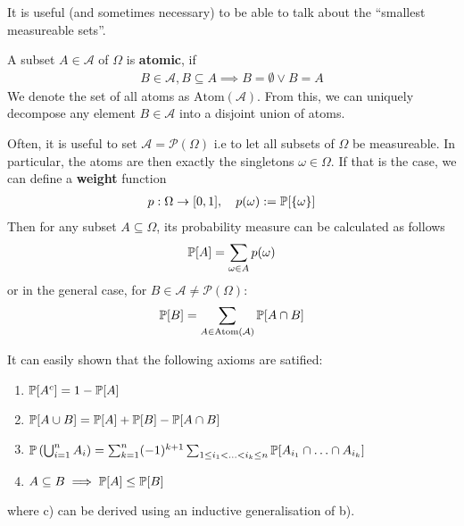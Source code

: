 It is useful (and sometimes necessary) to be able to talk about the ``smallest measureable sets''.
\begin{dfn}[]
A subset $A \in \mathcal{A}$ of $\Omega$ is \textbf{atomic}, if 
\begin{align*}
  B \in \mathcal{A}, B \subseteq A \implies B = \emptyset \lor B = A
\end{align*}
We denote the set of all atoms as $\text{Atom}(\mathcal{A})$. 
From this, we can uniquely decompose any element $B \in \mathcal{A}$ into a disjoint union of atoms.
\end{dfn}

\begin{rem}[]
  Often, it is useful to set $\mathcal{A} = \mathcal{P}(\Omega)$ i.e to let all subsets of $\Omega$ be measureable. In particular, the atoms are then exactly the singletons $\omega \in \Omega$. If that is the case, we can define a \textbf{weight} function
\begin{align*}
  p: \Omega \to [0,1], \quad p(\omega) := \mathbb{P}[\{\omega\}]
\end{align*}
  Then for any subset $A \subseteq \Omega$, its probability measure can be calculated as follows
  \begin{align*}
    \mathbb{P}[A] = \sum_{\omega \in A}p(\omega)
  \end{align*}
  or in the general case, for $B \in \mathcal{A} \neq \mathcal{P}(\Omega)$:
  \begin{align*}
    \mathbb{P}[B] = \sum_{A \in \text{Atom}(\mathcal{A})} \mathbb{P}[A \cap B]
  \end{align*}
\end{rem}

It can easily shown that the following axioms are satified:
\begin{enumerate}
  \item $\mathbb{P}[A^{c}] = 1 - \mathbb{P}[A]$
  \item $\mathbb{P}[A\cup B] = \mathbb{P}[A] + \mathbb{P}[B] - \mathbb{P}[A \cap B]$
  \item $\mathbb{P}\left(\bigcup_{i = 1}^n A_i\right) = \sum_{k=1}^n (-1)^{k+1} \sum_{1 \leq i_1 <\ldots < i_k \leq n} \mathbb{P}[A_{i_1} \cap \ldots \cap A_{i_k}]$
  \item $A \subseteq B \implies \mathbb{P}[A] \leq \mathbb{P}[B]$
\end{enumerate}
where c) can be derived using an inductive generalisation of b).

